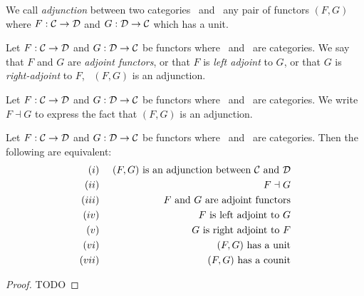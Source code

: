 \begin{defin}\label{Adj:def:adjunction}
    We call {\em adjunction} between two categories \Cat\ and \Dat\ any
    pair of functors $(F,G)$ where $F:\mbox{$\cal C$}\to\mbox{$\cal D$}$ and $G:\mbox{$\cal D$}\to\mbox{$\cal C$}$ which 
    has a unit.
\end{defin}

\begin{defin}\label{Adj:def:left:right:adjoint}
    Let $F:\mbox{$\cal C$}\to\mbox{$\cal D$}$ and $G:\mbox{$\cal D$}\to\mbox{$\cal C$}$ be functors where \Cat\ and \Dat\ 
    are categories. We say that $F$ and $G$ are {\em adjoint functors}, 
    or that $F$ is {\em left adjoint} to $G$, or that $G$ is {\em right-adjoint}
    to $F$, \ifand\ $(F,G)$ is an adjunction.
\end{defin}

\begin{notation}\label{Adj:notation:adjunction}
    Let $F:\mbox{$\cal C$}\to\mbox{$\cal D$}$ and $G:\mbox{$\cal D$}\to\mbox{$\cal C$}$ be functors where \Cat\ and \Dat\ 
    are categories. We write $F\dashv G$ to express the fact that $(F,G)$
    is an adjunction.
\end{notation}

\begin{prop}\label{Adj:prop:adjunction:charac}
    Let $F:\mbox{$\cal C$}\to\mbox{$\cal D$}$ and $G:\mbox{$\cal D$}\to\mbox{$\cal C$}$ be functors where \Cat\ and \Dat\ 
    are categories. Then the following are equivalent:
        \begin{eqnarray*}
            (i)&\ &\mbox{$(F,G)$ is an adjunction between \Cat\ and \Dat}\\
            (ii)&\ &F\dashv G\\
            (iii)&\ &\mbox{$F$ and $G$ are adjoint functors}\\
            (iv)&\ &\mbox{$F$ is left adjoint to $G$}\\
            (v)&\ &\mbox{$G$ is right adjoint to $F$}\\
            (vi)&\ &\mbox{$(F,G)$ has a unit}\\
            (vii)&\ &\mbox{$(F,G)$ has a counit}\\
        \end{eqnarray*}
\end{prop}
\begin{proof}
    TODO
\end{proof}
